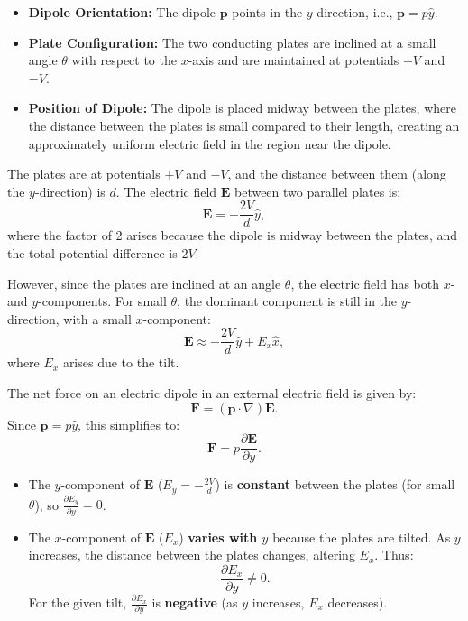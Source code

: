 \documentclass[a4paper]{article}
\begin{document}
\begin{tcolorbox}[
    title=Solution,
    colback=white,
    colframe=myblue,
    coltitle=black,
    fonttitle=\bfseries\large,
    breakable,
    enhanced,
    attach boxed title to top center={yshift=-2mm},
    boxed title style={colback=myblue!20, colframe=myblue}
]

\begin{itemize}
    \item \textbf{Dipole Orientation:} The dipole $\mathbf{p}$ points in the $y$-direction, i.e., $\mathbf{p} = p \hat{y}$.
    \item \textbf{Plate Configuration:} The two conducting plates are inclined at a small angle $\theta$ with respect to the $x$-axis and are maintained at potentials $+V$ and $-V$.
    \item \textbf{Position of Dipole:} The dipole is placed midway between the plates, where the distance between the plates is small compared to their length, creating an approximately uniform electric field in the region near the dipole.
\end{itemize}

The plates are at potentials $+V$ and $-V$, and the distance between them (along the $y$-direction) is $d$. The electric field $\mathbf{E}$ between two parallel plates is:
\[
\mathbf{E} = -\frac{2V}{d} \hat{y},
\]
where the factor of 2 arises because the dipole is midway between the plates, and the total potential difference is $2V$.

However, since the plates are inclined at an angle $\theta$, the electric field has both $x$- and $y$-components. For small $\theta$, the dominant component is still in the $y$-direction, with a small $x$-component:
\[
\mathbf{E} \approx -\frac{2V}{d} \hat{y} + E_x \hat{x},
\]
where $E_x$ arises due to the tilt.

The net force on an electric dipole in an external electric field is given by:
\[
\mathbf{F} = (\mathbf{p} \cdot \nabla) \mathbf{E}.
\]
Since $\mathbf{p} = p \hat{y}$, this simplifies to:
\[
\mathbf{F} = p \frac{\partial \mathbf{E}}{\partial y}.
\]

\begin{itemize}
    \item The $y$-component of $\mathbf{E}$ ($E_y = -\frac{2V}{d}$) is \textbf{constant} between the plates (for small $\theta$), so $\frac{\partial E_y}{\partial y} = 0$.
    \item The $x$-component of $\mathbf{E}$ ($E_x$) \textbf{varies with $y$} because the plates are tilted. As $y$ increases, the distance between the plates changes, altering $E_x$. Thus:
        \[
        \frac{\partial E_x}{\partial y} \neq 0.
        \]
        For the given tilt, $\frac{\partial E_x}{\partial y}$ is \textbf{negative} (as $y$ increases, $E_x$ decreases).
\end{itemize}


\end{tcolorbox}
\end{document}
